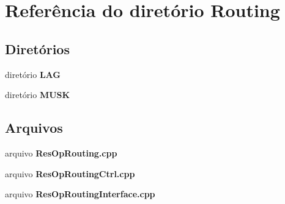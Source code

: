 \section{Referência do diretório Routing}
\label{dir_baec3ab5b69b843d363fe97388b3e046}
\subsection*{Diretórios}
\begin{DoxyCompactItemize}
\item 
diretório {\bf L\+AG}
\item 
diretório {\bf M\+U\+SK}
\end{DoxyCompactItemize}
\subsection*{Arquivos}
\begin{DoxyCompactItemize}
\item 
arquivo {\bf Res\+Op\+Routing.\+cpp}
\item 
arquivo {\bf Res\+Op\+Routing\+Ctrl.\+cpp}
\item 
arquivo {\bf Res\+Op\+Routing\+Interface.\+cpp}
\end{DoxyCompactItemize}
